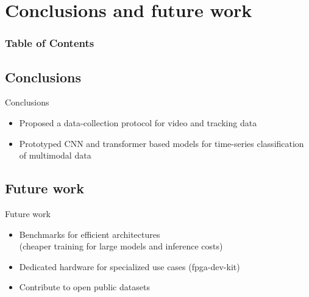 
\section{Conclusions and future work}

\begin{frame}
  \frametitle{Table of Contents}
  \tableofcontents[currentsection]
\end{frame}

\subsection{Conclusions}
{
\begin{frame}{Conclusions}

\begin{itemize}
\item Proposed a data-collection protocol for video and tracking data
\item Prototyped CNN and transformer based models for time-series classification of multimodal data
\end{itemize}

\end{frame}
}


\subsection{Future work}
{
\begin{frame}{Future work}

\begin{itemize}
\item Benchmarks for efficient architectures \\ (cheaper training for large models and inference costs)
\item Dedicated hardware for specialized use cases (fpga-dev-kit)
\item Contribute to open public datasets
\end{itemize}

\end{frame}
}


